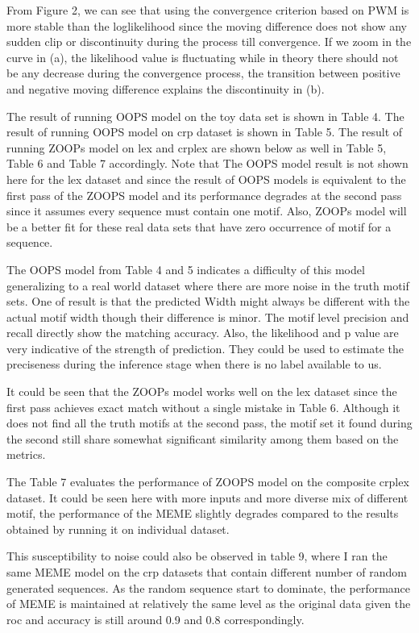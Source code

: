 \documentclass{article}
\begin{document}
From Figure 2, we can see that using the convergence criterion based on PWM is more stable than the loglikelihood since the moving difference does not show any sudden clip or discontinuity during the process till convergence. If we zoom in the curve in (a), the likelihood value is fluctuating while in theory there should not be any decrease during the convergence process, the transition between positive and negative moving difference explains the discontinuity in (b). 

The result of running OOPS model on the toy data set is shown in Table 4. The result of running OOPS model on crp dataset is shown in Table 5. The result of running ZOOPs model on lex and crplex are shown below as well in Table 5, Table 6 and Table 7 accordingly. Note that The OOPS model result is not shown here for the lex dataset and since the result of OOPS models is equivalent to the first pass of the ZOOPS model and its performance degrades at the second pass since it assumes every sequence must contain one motif. Also, ZOOPs model will be a better fit for these real data sets that have zero occurrence of motif for a sequence.

The OOPS model from Table 4 and 5 indicates a difficulty of this model generalizing to a real world dataset where there are more noise in the truth motif sets. One of result is that the predicted Width might always be different with the actual motif width though their difference is minor. The motif level precision and recall directly show the matching accuracy. Also, the likelihood and p value are very indicative of the strength of prediction. They could be used to estimate the preciseness during the inference stage when there is no label available to us. 

It could be seen that the ZOOPs model works well on the lex dataset since the first pass achieves exact match without a single mistake in Table 6. Although it does not find all the truth motifs at the second pass, the motif set it found during the second still share somewhat significant similarity among them based on the metrics.

The Table 7 evaluates the performance of ZOOPS model on the composite crplex dataset. It could be seen here with more inputs and more diverse mix of different motif, the performance of the MEME slightly degrades compared to the results obtained by running it on individual dataset.

This susceptibility to noise could also be observed in table 9, where I ran the same MEME model on the crp datasets that contain different number of random generated sequences. As the random sequence start to dominate, the performance of MEME is maintained at relatively the same level as the original data given the roc and accuracy is still around 0.9 and 0.8 correspondingly.
\end{document}
